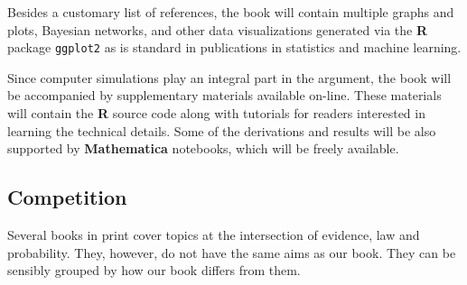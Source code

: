 \documentclass[
  10pt,
  dvipsnames,enabledeprecatedfontcommands]{scrartcl}
\begin{document}
\vspace{-2mm}

Besides a customary list of references, the book will contain multiple
graphs and plots, Bayesian networks, and other data visualizations
generated via the \textbf{\textsf{R}} package \texttt{ggplot2} as is
standard in publications in statistics and machine learning.

Since computer simulations play an integral part in the argument, the
book will be accompanied by supplementary materials available on-line.
These materials will contain the \textbf{\textsf{R}} source code along
with tutorials for readers interested in learning the technical details.
Some of the derivations and results will be also supported by
\textbf{\textsf{Mathematica}} notebooks, which will be freely available.

\hypertarget{competition}{%
\subsection{Competition}\label{competition}}

\normalsize

Several books in print cover topics at the intersection of evidence, law
and probability. They, however, do not have the same aims as our book.
They can be sensibly grouped by how our book differs from them.
\end{document}
